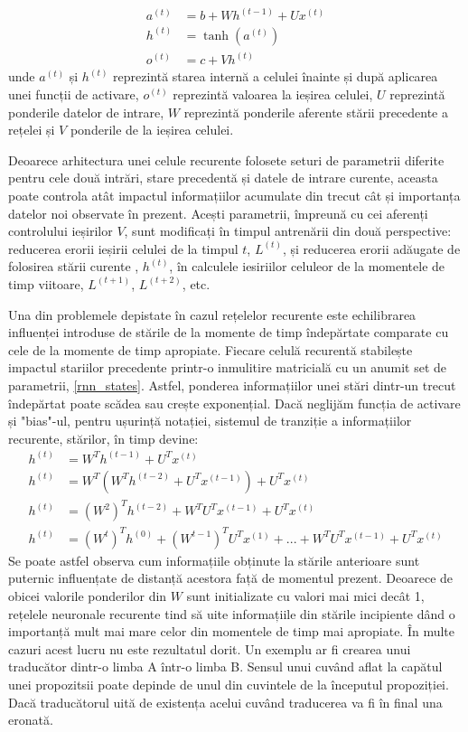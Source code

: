 \documentclass[a4paper,12pt]{book}
\begin{document}
				\begin{align}
					a^{(t)} &= b + Wh^{(t-1)} + Ux^{(t)} \\ \label{rnn_states}
					h^{(t)} &= \tanh{(a^{(t)})}\\
					o^{(t)} &= c + Vh^{(t)}	
				\end{align}
				unde $a^{(t)}$ și $h^{(t)}$ reprezintă starea internă a celulei înainte și după aplicarea unei funcții de activare, $o^{(t)}$ reprezintă valoarea la ieșirea celulei, $U$ reprezintă ponderile datelor de intrare, $W$ reprezintă ponderile aferente stării precedente a rețelei și $V$ ponderile de la ieșirea celulei. \par
				
				Deoarece arhitectura unei celule recurente folosete seturi de parametrii diferite pentru cele două intrări, stare precedentă și datele de intrare curente, aceasta poate controla atât impactul informațiilor acumulate din trecut cât și importanța datelor noi observate în prezent. Acești parametrii, împreună cu cei aferenți controlului ieșirilor $V$,  sunt modificați în timpul antrenării din două perspective: reducerea erorii ieșirii celulei de la timpul $t$, $L^{(t)}$,  și reducerea erorii adăugate de folosirea stării curente , $h^{(t)}$, în calculele iesiriilor celuleor de la momentele de timp viitoare, $L^{(t+1)}$, $L^{(t+2)}$, etc. \par
				
				Una din problemele depistate în cazul rețelelor recurente este echilibrarea influenței introduse de stările de la momente de timp îndepărtate comparate cu cele de la momente de timp apropiate. Fiecare celulă recurentă stabilește impactul stariilor precedente printr-o inmulitire matricială cu un anumit set de parametrii, \ref{rnn_states}. Astfel, ponderea informațiilor unei stări dintr-un trecut îndepărtat poate scădea sau crește exponențial. Dacă neglijăm funcția de activare și "bias"-ul, pentru ușurință notației, sistemul de tranziție a informațiilor recurente, stărilor, în timp devine:
				\begin{align*}
				h^{(t)} &=  W^Th^{(t-1)} + U^Tx^{(t)}\\				
				h^{(t)} &=  W^T(W^Th^{(t-2)} + U^Tx^{(t-1)}) + U^Tx^{(t)}\\	
				h^{(t)} &= (W^2)^Th^{(t-2)} + W^TU^Tx^{(t-1)} + U^Tx^{(t)}\\	
				h^{(t)} &= (W^t)^Th^{(0)} + (W^{t-1})^TU^Tx^{(1)}+ ...+ W^TU^Tx^{(t-1)} + U^Tx^{(t)}
				\end{align*}
				Se poate astfel observa cum informațiile obținute la stările anterioare sunt puternic influențate de distanță acestora față de momentul prezent. Deoarece de obicei valorile ponderilor din $W$ sunt initializate cu valori mai mici decât 1, rețelele neuronale recurente tind să uite informațiile din stările incipiente dând o importanță mult mai mare celor din momentele de timp mai apropiate. În multe cazuri acest lucru nu este rezultatul dorit. Un exemplu ar fi crearea unui traducător dintr-o limba A într-o limba B. Sensul unui cuvând aflat la capătul unei propozitsii poate depinde de unul din cuvintele de la începutul propoziției. Dacă traducătorul uită de existența acelui cuvând traducerea va fi în final una eronată.\par
				
\end{document}
